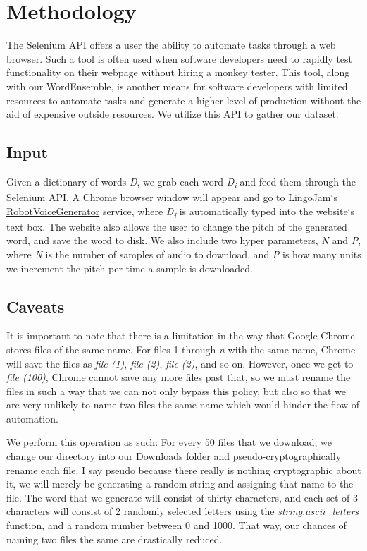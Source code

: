 \documentclass[12pt,journal,compsoc]{IEEEtran}
\begin{document}
\section{Methodology}
The Selenium API offers a user the ability to automate tasks through a web browser. Such a tool is often used when software developers need to rapidly test functionality on their webpage without hiring a monkey tester. This tool, along with our WordEnsemble, is another means for software developers with limited resources to automate tasks and generate a higher level of production without the aid of expensive outside resources. We utilize this API to gather our dataset. 

\subsection{Input}
Given a dictionary of words \textit{D}, we grab each word \textit{D\textsubscript{i}} and feed them through the Selenium API. A Chrome browser window will appear and go to \href{https://lingojam.com/RobotVoiceGenerator}{LingoJam`s RobotVoiceGenerator} service, where \textit{D\textsubscript{i}} is automatically typed into the website`s text box. The website also allows the user to change the pitch of the generated word, and save the word to disk. We also include two hyper parameters, \textit{N} and \textit{P}, where \textit{N} is the number of samples of audio to download, and \textit{P} is how many units we increment the pitch per time a sample is downloaded. 

\subsection{Caveats}
It is important to note that there is a limitation in the way that Google Chrome stores files of the same name. For files 1 through \textit{n} with the same name, Chrome will save the files as \textit{file (1)}, \textit{file (2)}, \textit{file (2)}, and so on. However, once we get to \textit{file (100)}, Chrome cannot save any more files past that, so we must rename the files in such a way that we can not only bypass this policy, but also so that we are very unlikely to name two files the same name which would hinder the flow of automation. 

We perform this operation as such: For every 50 files that we download, we change our directory into our Downloads folder and pseudo-cryptographically rename each file. I say pseudo because there really is nothing cryptographic about it, we will merely be generating a random string and assigning that name to the file. The word that we generate will consist of thirty characters, and each set of 3 characters will consist of 2 randomly selected letters using the \textit{string.ascii\_letters} function, and a random number between 0 and 1000. That way, our chances of naming two files the same are drastically reduced. 
\end{document}
